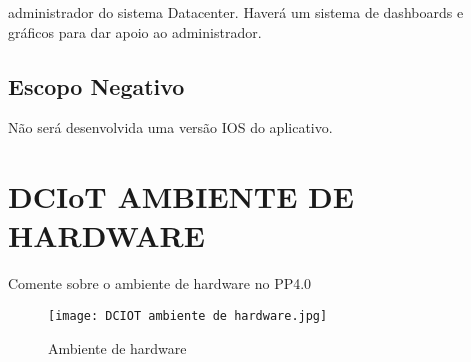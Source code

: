 administrador do sistema Datacenter. Haverá um sistema de dashboards e gráficos para dar apoio ao administrador.

\subsection {Escopo Negativo}

Não será desenvolvida uma versão IOS do aplicativo.


\section{DCIoT AMBIENTE DE HARDWARE}

Comente sobre o ambiente de hardware no PP4.0
\begin{figure}[h]
	\centering
	\texttt{[image: DCIOT ambiente de hardware.jpg]} 
	\caption{Ambiente de hardware}
	\label{F1}
\end{figure}



